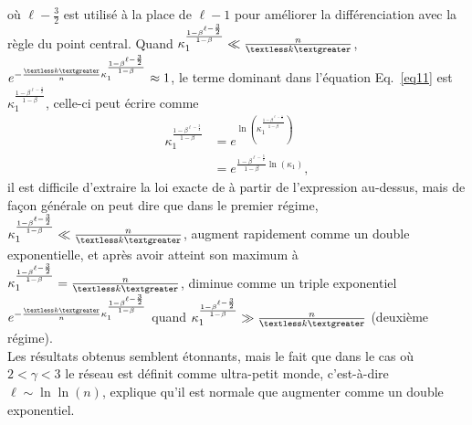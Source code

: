 où $ \ell-\frac{3}{2} $ est utilisé à la place de $ \ell-1$ pour améliorer la différenciation avec la règle du point central. Quand $\kappa_1^{\frac{1-\beta^{\ell-\frac{3}{2}}}{1-\beta}}\ll\frac{n}{\km}$,  $e^{-\frac{\km}{n}\kappa_1^{\frac{1-\beta^{\ell-\frac{3}{2}}}{1-\beta}}}\approx 1$, le terme dominant dans l'équation Eq.~\eqref{eq11} est $\kappa_1^{\frac{1-\beta^{\ell-\frac{3}{2}}}{1-\beta}}$, celle-ci peut écrire comme
\begin{align}
\kappa_1^{\frac{1-\beta^{\ell-\frac{3}{2}}}{1-\beta}}&=e^{\ln(\kappa_1^{\frac{1-\beta^{\ell-\frac{3}{2}}}{1-\beta}})}\nonumber\\
&= e^{\frac{1-\beta^{\ell-\frac{3}{2}}}{1-\beta}\ln(\kappa_1)},
\end{align}
il est difficile d'extraire la loi exacte de \nl à partir de l'expression au-dessus, mais de façon générale on peut dire que \nl dans le premier régime, $\kappa_1^{\frac{1-\beta^{\ell-\frac{3}{2}}}{1-\beta}}\ll\frac{n}{\km}$, augment rapidement comme un double exponentielle, et après avoir atteint son maximum à $\kappa_1^{\frac{1-\beta^{\ell-\frac{3}{2}}}{1-\beta}}=\frac{n}{\km}$, \nl diminue comme un triple exponentiel
$e^{-\frac{\km}{n}\kappa_1^{\frac{1-\beta^{\ell-\frac{3}{2}}}{1-\beta}}}$ quand $\kappa_1^{\frac{1-\beta^{\ell-\frac{3}{2}}}{1-\beta}}\gg\frac{n}{\km}$ (deuxième régime).\\
Les résultats obtenus semblent étonnants, mais le fait que dans le cas où $2<\gamma<3$ le réseau est définit comme ultra-petit monde, c'est-à-dire $\ell\sim \ln\ln(n)$, explique qu'il est normale que \nl augmenter comme un double exponentiel.
